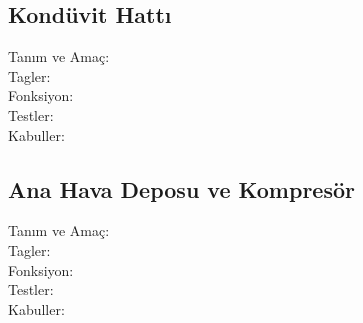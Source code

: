 \documentclass[10pt,a4paper]{article}
\begin{document}
\subsection{Kondüvit Hattı}
\begin{description}
\item[Tanım ve Amaç:] 
\item[Tagler:]
\item[Fonksiyon:]
\item[Testler:]
\item[Kabuller:]
\end{description}
\newpage

\subsection{Ana Hava Deposu ve Kompresör}
\begin{description}
\item[Tanım ve Amaç:] 
\item[Tagler:]
\item[Fonksiyon:]
\item[Testler:]
\item[Kabuller:]
\end{description}

\newpage
\end{document}
